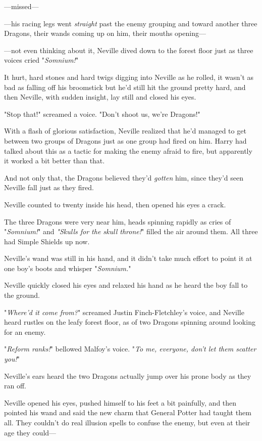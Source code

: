 ---missed---

---his racing legs went \emph{straight} past the enemy grouping and toward another three Dragons, their wands coming up on him, their mouths opening---

---not even thinking about it, Neville dived down to the forest floor just as three voices cried "\emph{Somnium!}"

It hurt, hard stones and hard twigs digging into Neville as he rolled, it wasn't as bad as falling off his broomstick but he'd still hit the ground pretty hard, and then Neville, with sudden insight, lay still and closed his eyes.

"Stop that!" screamed a voice. "Don't shoot us, we're Dragons!"

With a flash of glorious satisfaction, Neville realized that he'd managed to get between two groups of Dragons just as one group had fired on him. Harry had talked about this as a tactic for making the enemy afraid to fire, but apparently it worked a bit better than that.

And not only that, the Dragons believed they'd \emph{gotten} him, since they'd seen Neville fall just as they fired.

Neville counted to twenty inside his head, then opened his eyes a crack.

The three Dragons were very near him, heads spinning rapidly as cries of "\emph{Somnium!}" and \emph{"Skulls for the skull throne!}" filled the air around them. All three had Simple Shields up now.

Neville's wand was still in his hand, and it didn't take much effort to point it at one boy's boots and whisper "\emph{Somnium.}"

Neville quickly closed his eyes and relaxed his hand as he heard the boy fall to the ground.

"\emph{Where'd it come from?}" screamed Justin Finch-Fletchley's voice, and Neville heard rustles on the leafy forest floor, as of two Dragons spinning around looking for an enemy.

"\emph{Reform ranks!}" bellowed Malfoy's voice. "\emph{To me, everyone, don't let them scatter you!}"

Neville's ears heard the two Dragons actually jump over his prone body as they ran off.

Neville opened his eyes, pushed himself to his feet a bit painfully, and then pointed his wand and said the new charm that General Potter had taught them all. They couldn't do real illusion spells to confuse the enemy, but even at their age they could---

